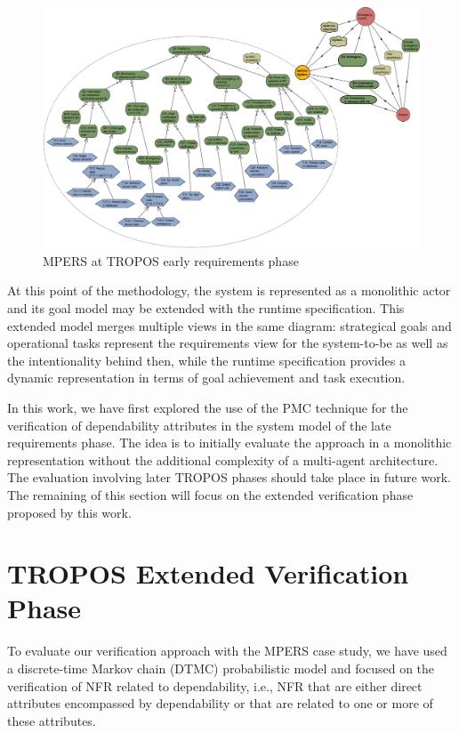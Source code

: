 \begin{figure}[h!]
\centering
\includegraphics[width=1\textwidth]{imgs/MPERS_LR.png}
\caption{MPERS at TROPOS early requirements phase}
\label{fig:MPERS_LR}
\end{figure}

At this point of the methodology, the system is represented as a monolithic actor and its goal model may be extended with the runtime specification. This extended model merges multiple views in the same diagram: strategical goals and operational tasks represent the requirements view for the system-to-be as well as the intentionality behind then, while the runtime specification provides a dynamic representation in terms of goal achievement  and task execution.

In this work, we have first explored the use of the PMC technique for the verification of dependability attributes in the system model of the late requirements phase. The idea is to initially evaluate the approach in a monolithic representation without the additional complexity of a multi-agent architecture. The evaluation involving later TROPOS phases should take place in future work. The remaining of this section will focus on the extended verification phase proposed by this work.

\section{TROPOS Extended Verification Phase}

To evaluate our verification approach with the MPERS case study, we have used a discrete-time Markov chain (DTMC) probabilistic model and focused on the verification of NFR related to dependability, i.e., NFR that are either direct attributes encompassed by dependability or that are related to one or more of these attributes.

